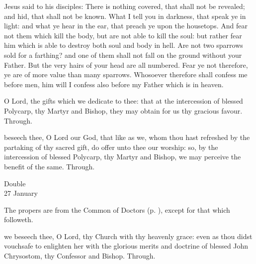  Jesus said to his disciples: There is nothing covered, that shall not be revealed; and hid, that shall not be known. What I tell you in darkness, that speak ye in light: and what ye hear in the ear, that preach ye upon the housetops. And fear not them which kill the body, but are not able to kill the soul: but rather fear him which is able to destroy both soul and body in hell. Are not two sparrows sold for a farthing? and one of them shall not fall on the ground without your Father. But the very hairs of your head are all numbered. Fear ye not therefore, ye are of more value than many sparrows. Whosoever therefore shall confess me before men, him will I confess also before my Father which is in heaven.


\secret
{} O Lord, the gifts which we dedicate to thee: that at the intercession of blessed Polycarp, thy Martyr and Bishop, they may obtain for us thy gracious favour. Through.


\postcommunion
{} beseech thee, O Lord our God, that like as we, whom thou hast refreshed by the partaking of thy sacred gift, do offer unto thee our worship: so, by the intercession of blessed Polycarp, thy Martyr and Bishop, we may perceive the benefit of the same. Through.


\begin{inhead}
    {Double\\
27 January}
\end{inhead}

\begin{rubric}
	The propers are from the Common of Doctors (p. \pageref{CommonDoctors}), except for that which followeth.
\end{rubric}

\collect
{} we beseech thee, O Lord, thy Church with thy heavenly grace: even as thou didst vouchsafe to enlighten her with the glorious merits and doctrine of blessed John Chrysostom, thy Confessor and Bishop. Through.



